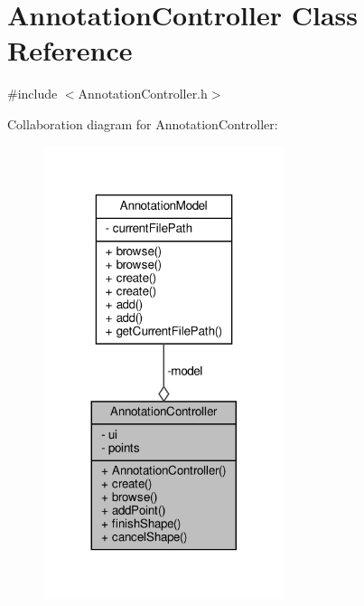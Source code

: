 \hypertarget{classAnnotationController}{}\section{Annotation\+Controller Class Reference}
\label{classAnnotationController}


{\ttfamily \#include $<$Annotation\+Controller.\+h$>$}



Collaboration diagram for Annotation\+Controller\+:
\nopagebreak
\begin{figure}[H]
\begin{center}
\leavevmode
\includegraphics[width=200pt]{classAnnotationController__coll__graph}
\end{center}
\end{figure}
